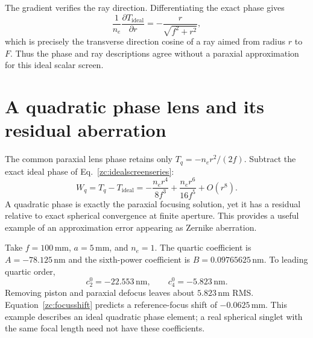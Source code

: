 The gradient verifies the ray direction. Differentiating the exact
phase gives
\begin{equation}
 \frac{1}{n_e}\frac{\partial T_{\mathrm{ideal}}}{\partial r}
      =-\frac{r}{\sqrt{f^2+r^2}},
\end{equation}
which is precisely the transverse direction cosine of a ray aimed
from radius $r$ to $F$. Thus the phase and ray descriptions agree
without a paraxial approximation for this ideal scalar screen.

\section{A quadratic phase lens and its residual aberration}
The common paraxial lens phase retains only
$T_q=-n_er^2/(2f)$. Subtract the exact ideal phase of
Eq.~\eqref{zc:idealscreenseries}:
\begin{equation}
 W_q=T_q-T_{\mathrm{ideal}}
       =-\frac{n_er^4}{8f^3}+\frac{n_er^6}{16f^5}+O(r^8).
 \label{zc:quadraticresidual}
\end{equation}
A quadratic phase is exactly the paraxial focusing solution, yet it has
a residual relative to exact spherical convergence at finite aperture.
This provides a useful example of an approximation error appearing as
Zernike aberration.

Take $f=100\,\mathrm{mm}$, $a=5\,\mathrm{mm}$, and $n_e=1$.
The quartic coefficient is $A=-78.125\,\mathrm{nm}$ and the sixth-power
coefficient is $B=0.09765625\,\mathrm{nm}$. To leading quartic order,
\begin{equation}
 c_2^0=-22.553\,\mathrm{nm},\qquad
 c_4^0=-5.823\,\mathrm{nm}.
\end{equation}
Removing piston and paraxial defocus leaves about
$5.823\,\mathrm{nm}$ RMS. Equation~\eqref{zc:focusshift} predicts a
reference-focus shift of $-0.0625\,\mathrm{mm}$. This example describes
an ideal quadratic phase element; a real spherical singlet with the
same focal length need not have these coefficients.

